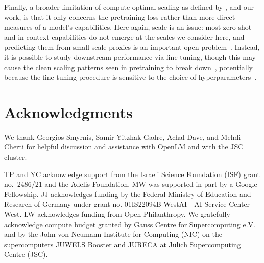 \documentclass{article}
\newcommand{\neurips}[1]{foo}
\newcommand{\workshop}[1]{baz}
\renewcommand{\neurips}[1]{\ignorespaces}%
\renewcommand{\workshop}[1]{\ignorespaces}%
\renewcommand{\neurips}[1]{\ignorespaces}%
\renewcommand{\workshop}[1]{#1}%
\renewcommand{\neurips}[1]{#1}%
\renewcommand{\workshop}[1]{\ignorespaces}%
\theoremstyle{plain}
\theoremstyle{definition}
\theoremstyle{remark}
\begin{document}
Finally, a broader limitation of compute-optimal scaling as defined by \citet{kaplan2020scaling}, \citet{hoffmann2022empirical} and our work, is that it only concerns the pretraining loss rather than more direct measures of a model's capabilities. Here again, scale is an issue: most zero-shot and in-context capabilities do not emerge at the scales we consider here, and predicting them from small-scale proxies is an important open problem~\cite{schaeffer2024emergent,gadre2024language}. Instead, it is possible to study downstream performance via fine-tuning, though this may cause the clean scaling patterns seen in pretraining to break down~\cite{tay2021scale}, potentially because the fine-tuning procedure is sensitive to the choice of hyperparameters~\cite{ivgi2022scaling}. 
  \workshop{
\section*{Acknowledgments}
We thank Georgios Smyrnis, Samir Yitzhak Gadre, Achal Dave, and Mehdi Cherti for helpful discussion and assistance with OpenLM and with the JSC cluster. 

TP and YC acknowledge support from the Israeli Science Foundation (ISF) grant no.\ 2486/21 and the Adelis Foundation. 
%
MW was supported in part by a Google Fellowship.
%
JJ acknowledges funding by the Federal Ministry of Education and Research of Germany under grant no. 01IS22094B WestAI - AI Service Center West.
%
LW acknowledges funding from Open Philanthropy.
We gratefully acknowledge compute budget granted by Gauss Centre for Supercomputing e.V. and by the John von Neumann Institute for Computing (NIC) on the supercomputers JUWELS Booster and JURECA at Jülich Supercomputing Centre (JSC). }
\newpage
\neurips{
\section*{Acknowledgments}
We thank Georgios Smyrnis, Samir Yitzhak Gadre, Achal Dave, and Mehdi Cherti for helpful discussion and assistance with OpenLM and with the JSC cluster. 

TP and YC acknowledge support from the Israeli Science Foundation (ISF) grant no.\ 2486/21 and the Adelis Foundation. 
%
MW was supported in part by a Google Fellowship.
%
JJ acknowledges funding by the Federal Ministry of Education and Research of Germany under grant no. 01IS22094B WestAI - AI Service Center West.
%
LW acknowledges funding from Open Philanthropy.
We gratefully acknowledge compute budget granted by Gauss Centre for Supercomputing e.V. and by the John von Neumann Institute for Computing (NIC) on the supercomputers JUWELS Booster and JURECA at Jülich Supercomputing Centre (JSC). }
\end{document}
